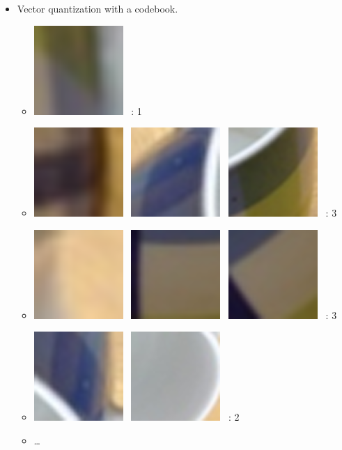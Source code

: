 \documentclass[t]{beamer}
\begin{document}
\begin{frame}
\begin{columns}
    \begin{column}{.46\linewidth}
      \begin{itemize}
        \item Vector quantization with a codebook.
          \begin{itemize}
            \item
              \includegraphics[width=.1\columnwidth]{mug2v11}~ : 1
            \item
              \includegraphics[width=.1\columnwidth]{mug2v21}~
              \includegraphics[width=.1\columnwidth]{mug2v22}~
              \includegraphics[width=.1\columnwidth]{mug2v23}~ : 3
            \item
              \includegraphics[width=.1\columnwidth]{mug2v31}~
              \includegraphics[width=.1\columnwidth]{mug2v32}~
              \includegraphics[width=.1\columnwidth]{mug2v33}~ : 3
            \item
              \includegraphics[width=.1\columnwidth]{mug2v41}~
              \includegraphics[width=.1\columnwidth]{mug2v42}~ : 2
            \item \ldots
          \end{itemize}
      \end{itemize}
    \end{column}
  \end{columns}
\end{frame}
\end{document}
